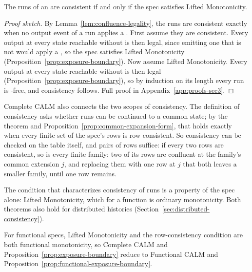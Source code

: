 \begin{theorem}
\label{thm:complete-calm}
The runs of an \spectype are consistent if and only if the spec satisfies
Lifted Monotonicity.
\end{theorem}

\begin{proof}[Proof sketch]
By Lemma~\ref{lem:confluence-legality}, the runs are consistent exactly when
no output event of a run applies a \commitment.  First assume they are
consistent.  Every output at every state reachable without \commitment is then
legal, since emitting one that is not would apply a \commitment, so the spec
satisfies Lifted Monotonicity (Proposition~\ref{prop:exposure-boundary}).  Now
assume Lifted Monotonicity.  Every output at every state reachable without
\commitment is then legal (Proposition~\ref{prop:exposure-boundary}), so by
induction on its length every run is \commitment-free, and consistency
follows.  Full proof in Appendix~\ref{app:proofs-sec3}.
\end{proof}

Complete CALM also connects the two scopes of consistency.  The definition of
consistency asks whether runs can be continued to a common state; by the
theorem and Proposition~\ref{prop:common-expansion-form}, that holds exactly
when every finite set of the spec's rows is row-consistent.  So consistency can
be checked on the table itself, and pairs of rows suffice: if every two rows
are consistent, so is every finite family: two of its rows are confluent at the family's common extension $j$, and replacing them with one row at $j$ that \outrel both leaves a smaller family, until one row remains.

The condition that characterizes consistency of runs is a property of the spec
alone: Lifted Monotonicity, which for a function is ordinary monotonicity.
Both theorems also hold for distributed histories
(Section~\ref{sec:distributed-consistency}).

For functional specs, Lifted Monotonicity and the row-consistency condition
are both functional monotonicity, so Complete CALM and
Proposition~\ref{prop:exposure-boundary} reduce to Functional CALM and
Proposition~\ref{prop:functional-exposure-boundary}.

